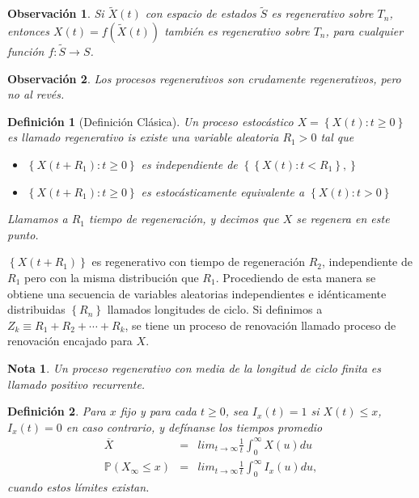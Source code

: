 \documentclass{article}
\newtheorem{Def}{Definición}
\newtheorem{Note}{Nota}
\newtheorem{Obs}{Observación}
\newcommand{\prob}{\mathbb{P}}
\begin{document}
\begin{Obs}
Si $\tilde{X}\left(t\right)$ con espacio de estados $\tilde{S}$ es regenerativo sobre $T_{n}$, entonces $X\left(t\right)=f\left(\tilde{X}\left(t\right)\right)$ tambi\'en es regenerativo sobre $T_{n}$, para cualquier funci\'on $f:\tilde{S}\rightarrow S$.
\end{Obs}

\begin{Obs}
Los procesos regenerativos son crudamente regenerativos, pero no al rev\'es.
\end{Obs}

\begin{Def}[Definici\'on Cl\'asica]
Un proceso estoc\'astico $X=\left\{X\left(t\right):t\geq0\right\}$ es llamado regenerativo is existe una variable aleatoria $R_{1}>0$ tal que
\begin{itemize}
\item[i)] $\left\{X\left(t+R_{1}\right):t\geq0\right\}$ es independiente de $\left\{\left\{X\left(t\right):t<R_{1}\right\},\right\}$
\item[ii)] $\left\{X\left(t+R_{1}\right):t\geq0\right\}$ es estoc\'asticamente equivalente a $\left\{X\left(t\right):t>0\right\}$
\end{itemize}

Llamamos a $R_{1}$ tiempo de regeneraci\'on, y decimos que $X$ se regenera en este punto.
\end{Def}

$\left\{X\left(t+R_{1}\right)\right\}$ es regenerativo con tiempo de regeneraci\'on $R_{2}$, independiente de $R_{1}$ pero con la misma distribuci\'on que $R_{1}$. Procediendo de esta manera se obtiene una secuencia de variables aleatorias independientes e id\'enticamente distribuidas $\left\{R_{n}\right\}$ llamados longitudes de ciclo. Si definimos a $Z_{k}\equiv R_{1}+R_{2}+\cdots+R_{k}$, se tiene un proceso de renovaci\'on llamado proceso de renovaci\'on encajado para $X$.

\begin{Note}
Un proceso regenerativo con media de la longitud de ciclo finita es llamado positivo recurrente.
\end{Note}


\begin{Def}
Para $x$ fijo y para cada $t\geq0$, sea $I_{x}\left(t\right)=1$ si $X\left(t\right)\leq x$,  $I_{x}\left(t\right)=0$ en caso contrario, y def\'inanse los tiempos promedio
\begin{eqnarray*}
\overline{X}&=&lim_{t\rightarrow\infty}\frac{1}{t}\int_{0}^{\infty}X\left(u\right)du\\
\prob\left(X_{\infty}\leq x\right)&=&lim_{t\rightarrow\infty}\frac{1}{t}\int_{0}^{\infty}I_{x}\left(u\right)du,
\end{eqnarray*}
cuando estos l\'imites existan.
\end{Def}
\end{document}
